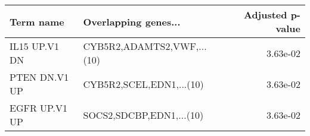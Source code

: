 \begin{tabular}{llr}
\toprule
    Term name &       Overlapping genes... &  Adjusted p-value \\
\midrule
IL15 UP.V1 DN & CYB5R2,ADAMTS2,VWF,...(10) &          3.63e-02 \\
PTEN DN.V1 UP &   CYB5R2,SCEL,EDN1,...(10) &          3.63e-02 \\
EGFR UP.V1 UP &   SOCS2,SDCBP,EDN1,...(10) &          3.63e-02 \\
\bottomrule
\end{tabular}
